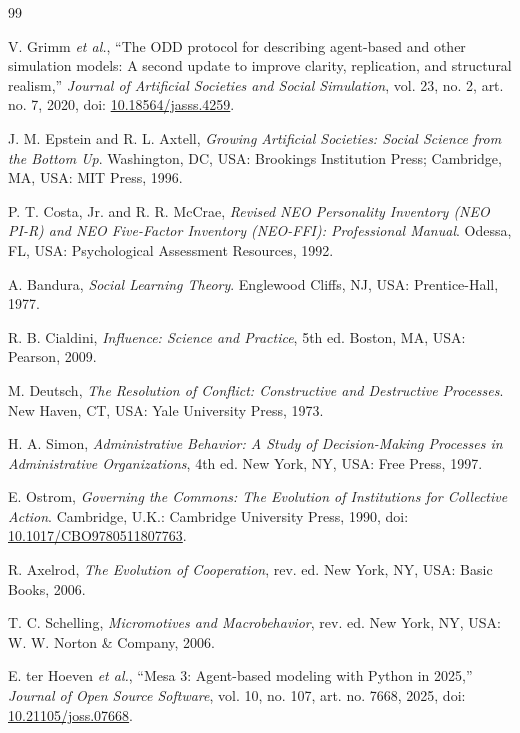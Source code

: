 \documentclass[10pt,a4paper]{article}
\begin{document}
\clearpage
\begin{thebibliography}{99}
\footnotesize
\setlength{\itemsep}{0.25em}
\setlength{\parsep}{0pt}

V. Grimm \emph{et al.}, ``The ODD protocol for describing agent-based and other
simulation models: A second update to improve clarity, replication, and
structural realism,'' \emph{Journal of Artificial Societies and Social
Simulation}, vol. 23, no. 2, art. no. 7, 2020,
doi: \href{https://doi.org/10.18564/jasss.4259}{10.18564/jasss.4259}.

J. M. Epstein and R. L. Axtell, \emph{Growing Artificial Societies: Social
Science from the Bottom Up}. Washington, DC, USA: Brookings Institution Press;
Cambridge, MA, USA: MIT Press, 1996.

P. T. Costa, Jr. and R. R. McCrae, \emph{Revised NEO Personality Inventory
(NEO PI-R) and NEO Five-Factor Inventory (NEO-FFI): Professional Manual}.
Odessa, FL, USA: Psychological Assessment Resources, 1992.

A. Bandura, \emph{Social Learning Theory}. Englewood Cliffs, NJ, USA:
Prentice-Hall, 1977.

R. B. Cialdini, \emph{Influence: Science and Practice}, 5th ed. Boston, MA,
USA: Pearson, 2009.

M. Deutsch, \emph{The Resolution of Conflict: Constructive and Destructive
Processes}. New Haven, CT, USA: Yale University Press, 1973.

H. A. Simon, \emph{Administrative Behavior: A Study of Decision-Making
Processes in Administrative Organizations}, 4th ed. New York, NY, USA:
Free Press, 1997.

E. Ostrom, \emph{Governing the Commons: The Evolution of Institutions for
Collective Action}. Cambridge, U.K.: Cambridge University Press, 1990,
doi: \href{https://doi.org/10.1017/CBO9780511807763}
{10.1017/CBO9780511807763}.

R. Axelrod, \emph{The Evolution of Cooperation}, rev. ed. New York, NY, USA:
Basic Books, 2006.

T. C. Schelling, \emph{Micromotives and Macrobehavior}, rev. ed. New York,
NY, USA: W. W. Norton \& Company, 2006.

E. ter Hoeven \emph{et al.}, ``Mesa 3: Agent-based modeling with Python in
2025,'' \emph{Journal of Open Source Software}, vol. 10, no. 107, art. no.
7668, 2025, doi:
\href{https://doi.org/10.21105/joss.07668}{10.21105/joss.07668}.


\end{thebibliography}
\end{document}
